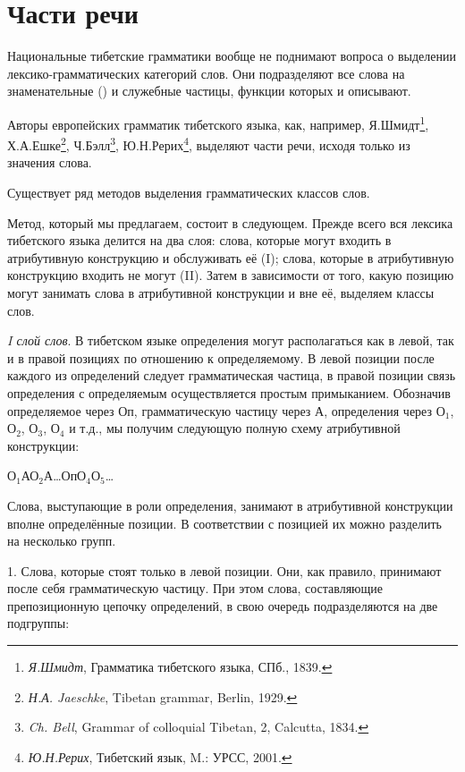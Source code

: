 \section{Части речи}

Национальные тибетские грамматики вообще не поднимают вопроса о выделении лексико-грамматических категорий слов. Они подразделяют все слова на знаменательные () и служебные частицы, функции которых и описывают.

Авторы европейских грамматик тибетского языка, как, например,
Я.Шмидт\footnote[20]{\emph{Я.Шмидт}, Грамматика тибетского языка, СПб., 1839.},
Х.А.Ешке\footnote[21]{\emph{Н.А. Jaeschke}, Tibetan grammar, Berlin, 1929.},
Ч.Бэлл\footnote[22]{\emph{Ch. Bell}, Grammar of colloquial Tibetan, 2, Calcutta, 1834.},
Ю.Н.Рерих\footnote[23]{\emph{Ю.Н.Рерих}, Тибетский язык, M.: УРСС, 2001.},
выделяют части речи, исходя только из значения слова.

Существует ряд методов выделения грамматических классов слов.

Метод, который мы предлагаем, состоит в следующем. Прежде всего вся лексика тибетского языка делится на два слоя: слова, которые могут входить в атрибутивную конструкцию и обслуживать её (I); слова, которые в атрибутивную конструкцию входить не могут (II). Затем в зависимости от того, какую позицию могут занимать слова в атрибутивной конструкции и вне её, выделяем классы слов.

\emph{I слой слов}. В тибетском языке определения могут располагаться как в левой, так и в правой позициях по отношению к определяемому. В левой позиции после каждого из определений следует грамматическая частица, в правой позиции связь определения с определяемым осуществляется простым примыканием. Обозначив определяемое через Оп, грамматическую частицу через А, определения через О$_{1}$, О$_{2}$, О$_{3}$, О$_{4}$ и т.д., мы получим следующую полную схему атрибутивной конструкции:
\begin{center}
    О$_{1}$АО$_{2}$А\dots ОпО$_{4}$О$_{5}$\dots
\end{center}

Слова, выступающие в роли определения, занимают в атрибутивной конструкции вполне определённые позиции. В соответствии с позицией их можно разделить на несколько групп.

1. Слова, которые стоят только в левой позиции. Они, как правило, принимают после себя грамматическую частицу. При этом слова, составляющие препозиционную цепочку определений, в свою очередь подразделяются на две подгруппы:

